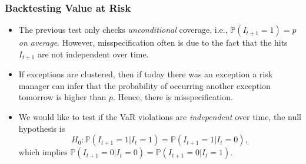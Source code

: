 \begin{frame}%

\frametitle{Backtesting Value at Risk}

\begin{itemize}
\item The previous test only checks \emph{\color{red}unconditional}
coverage, i.e., $\mathbb{P} ( I_{t+1} = 1 ) =p$ \emph{\color{red}on average}.
However, misspecification often is due to the fact that the hits $I_{t+1}$
are not independent over time.

\item If exceptions are clustered, then if today there was an exception a
risk manager can infer that the probability of occurring another exception
tomorrow is higher than $p$. Hence, there is misspecification.

\item We would like to test if the VaR violations are \emph{\color{red}%
independent} over time, the null hypothesis is
\begin{equation*}
H_{0}:\mathbb{P} (I_{t+1}=1|I_{t}=1)=\mathbb{P} (I_{t+1}=1|I_{t}=0),
\end{equation*}
which implies $\mathbb{P} (I_{t+1}=0|I_{t}=0)=\mathbb{P} (I_{t+1}=0|I_{t}=1) $.
\end{itemize}

\end{frame}%

